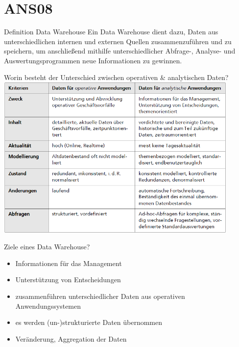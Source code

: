 \documentclass[a6paper,10pt,grid=front%
,toc
]{kartei}
\begin{document}
  \setcardpagelayout

  \section*{ANS08}

  \begin{karte}{Definition Data Warehouse}    
    Ein Data Warehouse dient dazu, Daten aus unterschiedlichen internen und externen Quellen zusammenzuführen und zu speichern, um anschließend mithilfe unterschiedlicher Abfrage-, Analyse- und Auswertungsprogrammen neue Informationen zu gewinnen.
  \end{karte}

  \begin{karte}{Worin besteht der Unterschied zwischen operativen \& analytischen Daten?}
    \includegraphics[width=0.9\textwidth]{img/diff_operativ_analytische_daten}
  \end{karte}

  \begin{karte}{Ziele eines Data Warehouse?}
    \begin{itemize}
      \item Informationen für das Management
      \item Unterstützung von Entscheidungen
      \item zusammenführen unterschiedlicher Daten aus operativen Anwendungssystemen
      \item es werden (un-)strukturierte Daten übernommen
      \item Veränderung, Aggregation der Daten
    \end{itemize}
  \end{karte}
\end{document}
